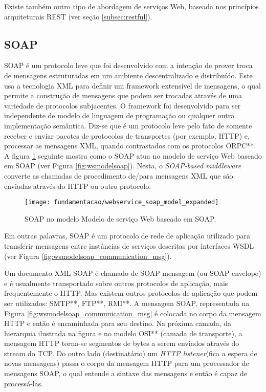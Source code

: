 Existe também outro tipo de abordagem de serviços Web, baseada nos princípios arquiteturais REST (ver seção \ref{subsec:restful}).

\subsection{SOAP}
\label{subsec:soap}
SOAP é um protocolo leve que foi desenvolvido com a intenção de prover troca de mensagens estruturadas em um ambiente descentralizado e distribuído. Este usa a tecnologia XML para definir um framework extensível de mensagens, o qual permite a construção de mensagens que podem ser trocadas através de uma variedade de protocolos subjacentes. O framework foi desenvolvido para ser independente de modelo de linguagem de programação ou qualquer outra implementação semântica\cite{w3c:soap}. Diz-se que é um protocolo leve pelo fato de somente receber e enviar pacotes de protocolos de transportes (por exemplo, HTTP) e, processar as mensagens XML, quando contrastados com os protocolos ORPC**\cite{Papazoglou_slides:2008}. A figura \ref{fig:wsmodelsoap_expanded} seguinte mostra como o SOAP atua no modelo de serviço Web baseado em SOAP (ver Figura \ref{fig:wsmodelsoap}). Nesta, o \textit{SOAP-based middleware} converte as chamadas de procedimento de/para mensagens XML que são enviadas através do HTTP ou outro protocolo.

\begin{figure}[!htb] \centering 
  \centering
  \texttt{[image: fundamentacao/webservice\_soap\_model\_expanded]} 
  \caption{SOAP no modelo Modelo de serviço Web baseado em SOAP.\cite{Papazoglou_slides:2008}} 
  \label{fig:wsmodelsoap_expanded}
\end{figure}

Em outras palavras, SOAP é um protocolo de rede de aplicação utilizado para transferir mensagens entre instâncias de serviços descritas por interfaces WSDL (ver Figura \ref{fig:wsmodelsoap_communication_msg}).

Um documento XML SOAP é chamado de SOAP mensagem (ou SOAP envelope) e é usualmente transportado sobre outros protocolos de aplicação, mais frequentemente o HTTP. Mas existem outros protocolos de aplicação que podem ser utilizados: SMTP**, FTP**, RMI**. A mensagem SOAP, representada na Figura \ref{fig:wsmodelsoap_communication_msg} é colocada no corpo da mensagem HTTP e então é encaminhada para seu destino. Na próxima camada, da hierarquia ilustrada na figura e no modelo OSI** (camada de transporte), a mensagem HTTP torna-se segmentos de bytes a serem enviados através do stream do TCP. Do outro lado (destinatário) um \textit{HTTP listener}(fica a espera de novas mensagens) passa o corpo da mensagem HTTP para um processador de mensagens SOAP, o qual entende a sintaxe das mensagens e então é capaz de processá-las.\cite{Papazoglou:2008}
 
